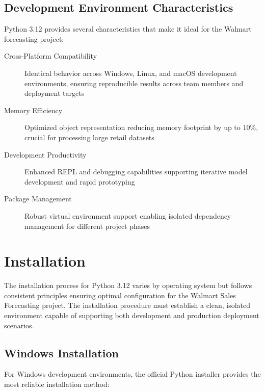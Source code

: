 \subsection{Development Environment Characteristics}

Python 3.12 provides several characteristics that make it ideal for the Walmart forecasting project:

\begin{description}
	\item[Cross-Platform Compatibility] Identical behavior across Windows, Linux, and macOS development environments, ensuring reproducible results across team members and deployment targets
	\item[Memory Efficiency] Optimized object representation reducing memory footprint by up to 10\%, crucial for processing large retail datasets
	\item[Development Productivity] Enhanced REPL and debugging capabilities supporting iterative model development and rapid prototyping
	\item[Package Management] Robust virtual environment support enabling isolated dependency management for different project phases
\end{description}

\section{Installation}

The installation process for Python 3.12 varies by operating system but follows consistent principles ensuring optimal configuration for the Walmart Sales Forecasting project. The installation procedure must establish a clean, isolated environment capable of supporting both development and production deployment scenarios.

\subsection{Windows Installation}

For Windows development environments, the official Python installer provides the most reliable installation method:

